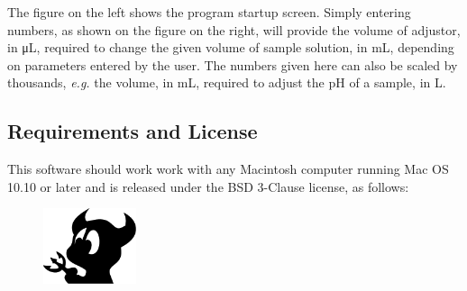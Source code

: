 \documentclass[a4paper]{article}
\begin{document}
		\noindent The figure on the left shows the program startup screen. Simply entering numbers, as shown on the figure on the right, will provide the volume of adjustor, in \si{\micro\liter}, required to change the given volume of sample solution, in \si{\milli\liter}, depending on parameters entered by the user. The numbers given here can also be scaled by thousands, \textit{e.g.} the volume, in \si{\milli\liter}, required to adjust the pH of a sample, in \si{\liter}.

		\clearpage


	\begin{centering}
 		\section*{Requirements and License}
 		\label{sec:requirements_and_license}
	\end{centering} 
		
			\noindent This software should work work with any Macintosh computer running Mac OS 10.10 or later and is released under the BSD 3-Clause license, as follows:

			\begin{figure}[ht!]
				\centering
				\includegraphics[height=6em]{Graphics/BSD}
			\end{figure}
\end{document}
